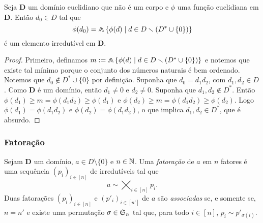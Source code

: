\begin{proposition}
	Seja $\bm D$ um domínio euclidiano que não é um corpo e $\phi$ uma função euclidiana em $\bm D$. Então $d_0 \in D$ tal que
	\begin{equation*}
	\phi(d_0) = \min\set{\phi(d)}{d \in D \setminus (D^* \cup \{0\})}
	\end{equation*}
é um elemento irredutível em $\bm D$.
\end{proposition}
\begin{proof}
Primeiro, definamos $m := \min\set{\phi(d)}{d \in D \setminus (D^* \cup \{0\}) }$ e notemos que existe tal mínimo porque o conjunto dos números naturais é bem ordenado. Notemos que $d_0 \notin D^* \cup \{0\}$ por definição. Suponha que $d_0 = d_1d_2$, com $d_1,d_2 \in D$. Como $\bm D$ é um domínio, então $d_1 \neq 0$ e $d_2 \neq 0$. Suponha que $d_1,d_2 \notin D^*$. Então $\phi(d_1) \geq m = \phi(d_1d_2) \geq \phi(d_1)$ e $\phi(d_2) \geq m = \phi(d_1d_2) \geq \phi(d_2)$. Logo $\phi(d_1)=\phi(d_1d_2)$ e $\phi(d_2)=\phi(d_1d_2)$, o que implica $d_1,d_2 \in D^*$, que é absurdo.
\end{proof}


\subsubsection{Fatoração}

\begin{definition}
Sejam $\bm D$ um domínio, $a \in D \setminus \{0\}$ e $n \in \mathbb{N}$. Uma \emph{fatoração} de $a$ em $n$ fatores é uma sequência $(p_i)_{i \in [n]}$ de irredutíveis tal que
	\begin{equation*}
	a \sim \bigtimes_{i \in [n]} p_i.
	\end{equation*}
Duas fatorações $(p_i)_{i \in [n]}$ e $(p'_i)_{i \in [n']}$ de $a$ são \emph{associadas} se, e somente se, $n=n'$ e existe uma permutação $\sigma \in \mathfrak{S}_n$ tal que, para todo $i \in [n]$, $p_i \sim p'_{\sigma(i)}$.
\end{definition}


